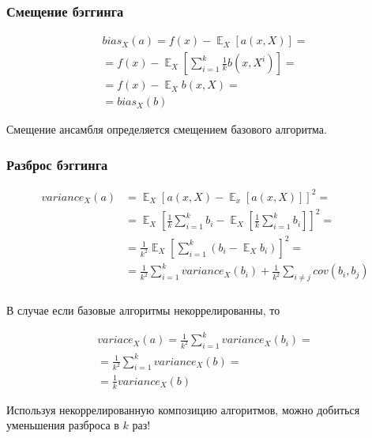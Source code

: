 \documentclass{beamer}
\DeclareMathOperator{\E}{\mathbb{E}}
\begin{document}
	\begin{frame}
		\frametitle{Смещение бэггинга}

		\begin{align*}
			bias_X(a) = 
			f(x) - \E_X[a(x, X)] = \\
			= f(x) - \E_X \left[\sum_{i=1}^{k} \frac{1}{k} b(x, X^i) \right] = \\
			= f(x) - \E_X b(x, X) = \\
			= bias_X(b)
		\end{align*}

		Смещение ансамбля определяется смещением базового алгоритма.
	\end{frame}

	\begin{frame}
		\frametitle{Разброс бэггинга}

		\begin{align*}
			variance_X(a) & = \E_X [ a(x, X) - \E_x[a(x, X)] ]^2 = \\
			& = \E_X \left[ \frac{1}{k} \sum_{i=1}^{k} b_i - \E_X \left[ \frac{1}{k} \sum_{i=1}^{k} b_i \right] \right]^2 = \\
			& = \frac{1}{k^2} \E_X \left[ \sum_{i=1}^{k} \left( b_i - \E_X b_i \right) \right]^2 = \\
			& = \frac{1}{k^2} \sum_{i=1}^{k} variance_X(b_i) + 
			\frac{1}{k^2} \sum_{i \ne j} cov(b_i, b_j)
		\end{align*}
	\end{frame}

	\begin{frame}
		\frametitle{}

		В случае если базовые алгоритмы некоррелированны, то

		\begin{align*}
			variace_X(a) = \frac{1}{k^2} \sum_{i=1}^{k} variance_X(b_i) = \\ 
			= \frac{1}{k^2} \sum_{i=1}^{k} variance_X(b) = \\
			= \frac{1}{k} variance_X(b)
		\end{align*}

		Используя некоррелированную композицию алгоритмов, можно добиться уменьшения разброса 
		в $k$ раз!
	\end{frame}
\end{document}

